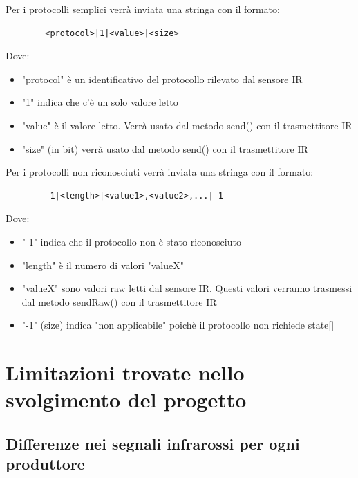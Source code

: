 \documentclass[a4paper,11pt]{article}
\begin{document}
    \begin{samepage}
      Per i protocolli semplici verrà inviata una stringa con il formato:

      \begin{verbatim}
        <protocol>|1|<value>|<size>
      \end{verbatim}

      Dove:
      \begin{itemize}
        \item "protocol" è un identificativo del protocollo rilevato dal sensore IR
        \item "1" indica che c'è un solo valore letto
        \item "value" è il valore letto. Verrà usato dal metodo send() con il trasmettitore IR
        \item "size" (in bit) verrà usato dal metodo send() con il trasmettitore IR
      \end{itemize}
    \end{samepage}

    \bigskip

    \begin{samepage}
      Per i protocolli non riconosciuti verrà inviata una stringa con il formato:

      \begin{verbatim}
        -1|<length>|<value1>,<value2>,...|-1
      \end{verbatim}

      Dove:
      \begin{itemize}
        \item "-1" indica che il protocollo non è stato riconosciuto
        \item "length" è il numero di valori "valueX"
        \item "valueX" sono valori raw letti dal sensore IR. Questi valori verranno trasmessi dal metodo sendRaw() con il trasmettitore IR
        \item "-1" (size) indica "non applicabile" poichè il protocollo non richiede state[]
      \end{itemize}
    \end{samepage}

\section{Limitazioni trovate nello svolgimento del progetto}

    \subsection{Differenze nei segnali infrarossi per ogni produttore}
\end{document}
